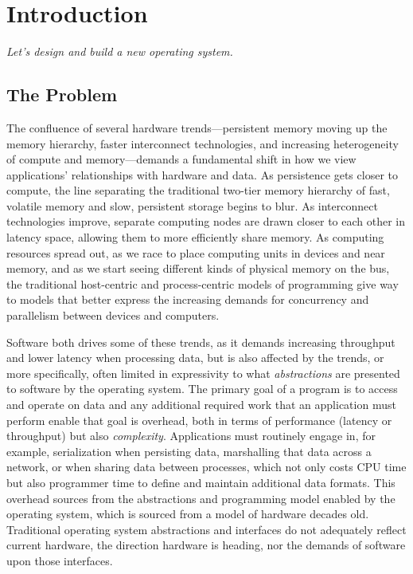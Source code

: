 
\chapter{Introduction}\label{ch:intro}

\emph{Let's design and build a new operating system.}

\section*{The Problem}

The confluence of several hardware trends---persistent memory moving up the memory hierarchy, faster interconnect
technologies, and increasing heterogeneity of compute and memory---demands a fundamental shift in how we view
applications' relationships with hardware and data. As persistence gets closer to compute, the line separating the traditional two-tier
memory hierarchy of fast, volatile memory and slow, persistent storage begins to blur. As interconnect technologies
improve, separate computing nodes are drawn closer to each other in latency space, allowing them to more efficiently
share memory. As computing resources spread out, as we race to place computing units in devices and near memory, and as
we start seeing different kinds of physical memory on the bus, the traditional host-centric and process-centric models
of programming give way to models that better express the increasing demands for concurrency and parallelism between
devices and computers.

Software both drives some of these trends, as it demands increasing throughput and lower latency when processing data,
but is also affected by the trends, or more specifically, often limited in expressivity to what \emph{abstractions} are
presented to software by the operating system. The primary goal of a program is to access and operate on data and any
additional required work that an application must perform enable that goal is overhead, both in terms of performance
(latency or throughput) but also \emph{complexity}. Applications must routinely engage in, for example, serialization
when persisting data, marshalling that data across a network, or when sharing data between processes, which not only
costs CPU time but also programmer time to define and maintain additional data formats. This overhead sources from the
abstractions and programming model enabled by the operating system, which is sourced from a model of hardware decades
old. Traditional operating system abstractions and interfaces do not adequately reflect current hardware, the direction hardware is
heading, nor the demands of software upon those interfaces.

